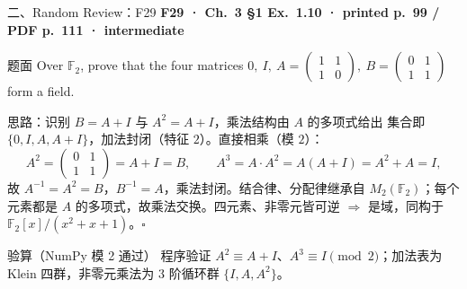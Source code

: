 \documentclass[aspectratio=169,10pt,fontset=none]{ctexbeamer}
\newcommand{\ex}[1]{\textcolor{accent}{\footnotesize\bfseries #1}}
\begin{document}
\begin{frame}[t]{二、Random Review：F29}
  \leavevmode\ex{F29 · Ch.~3 §1 Ex.~1.10 · printed p.~99 / PDF p.~111 · intermediate}
  \begin{block}{\footnotesize 题面}
    \scriptsize Over $\mathbb F_2$, prove that the four matrices $0,\ I,\ A=\begin{pmatrix}1&1\\1&0\end{pmatrix},\ B=\begin{pmatrix}0&1\\1&1\end{pmatrix}$ form a field.
  \end{block}
  \begin{exampleblock}{\footnotesize 思路：识别 $B=A+I$ 与 $A^2=A+I$，乘法结构由 $A$ 的多项式给出}
    \scriptsize
    集合即 $\{0,I,A,A+I\}$，加法封闭（特征 $2$）。直接相乘（模 $2$）：
    $$A^2=\begin{pmatrix}0&1\\1&1\end{pmatrix}=A+I=B,\qquad A^3=A\cdot A^2=A(A+I)=A^2+A=I,$$
    故 $A^{-1}=A^2=B$，$B^{-1}=A$，乘法封闭。结合律、分配律继承自 $M_2(\mathbb F_2)$；每个元素都是 $A$ 的多项式，故乘法交换。四元素、非零元皆可逆 $\Rightarrow$ 是域，同构于 $\mathbb F_2[x]/(x^2+x+1)$。$\square$
  \end{exampleblock}
  \begin{block}{\footnotesize 验算（NumPy 模 2 通过）}
    \scriptsize 程序验证 $A^2\equiv A+I$、$A^3\equiv I\pmod 2$；加法表为 Klein 四群，非零元乘法为 3 阶循环群 $\{I,A,A^2\}$。
  \end{block}
\end{frame}
\end{document}
